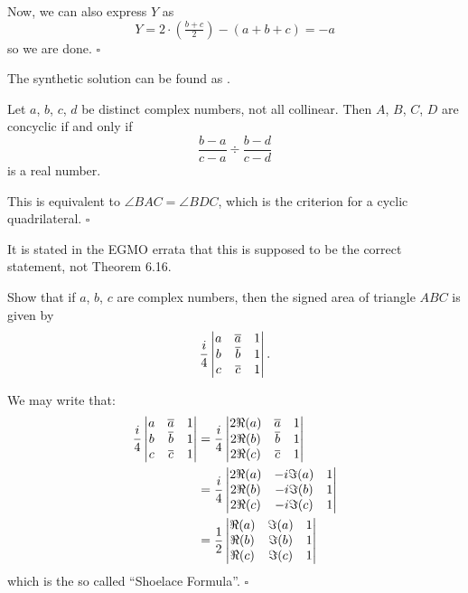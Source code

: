 \documentclass{article}
\begin{document}
Now, we can also express $Y$ as \[Y = 2\cdot(\tfrac{b+c}{2})-(a+b+c) = -a\] so we are done. $\square$
\begin{remark*}
The synthetic solution can be found as .
\end{remark*}

\begin{problem}[6.20]{}
Let $a$, $b$, $c$, $d$ be distinct complex numbers, not all collinear. Then $A$, $B$, $C$, $D$ are concyclic if and only if \[\dfrac{b - a}{c - a} \div \dfrac{b - d}{c - d}\] is a real number.
\end{problem}

This is equivalent to $\angle BAC = \angle BDC$, which is the criterion for a cyclic quadrilateral. $\square$

\begin{remark*}
It is stated in the EGMO errata that this is supposed to be the correct statement, not Theorem 6.16.
\end{remark*}

\begin{problem}[6.21]{}
Show that if $a$, $b$, $c$ are complex numbers, then the signed area of triangle $ABC$ is given by \[\dfrac{i}{4}\begin{vmatrix}a&\overline{a}&1\\b&\overline{b}&1\\c&\overline{c}&1\\\end{vmatrix}.\]
\end{problem}

We may write that:
\begin{align*}
\dfrac{i}{4}\begin{vmatrix}a&\overline{a}&1\\b&\overline{b}&1\\c&\overline{c}&1\\\end{vmatrix} &= \dfrac{i}{4}\begin{vmatrix}2\Re(a)&\overline{a}&1\\2\Re(b)&\overline{b}&1\\2\Re(c)&\overline{c}&1\\\end{vmatrix} \\
&= \dfrac{i}{4}\begin{vmatrix}2\Re(a)&-i\Im(a)&1\\2\Re(b)&-i\Im(b)&1\\2\Re(c)&-i\Im(c)&1\\\end{vmatrix} \\
&= \dfrac{1}{2}\begin{vmatrix}\Re(a)&\Im(a)&1\\\Re(b)&\Im(b)&1\\\Re(c)&\Im(c)&1\\\end{vmatrix}
\end{align*}
which is the so called ``Shoelace Formula''. $\square$
\end{document}
